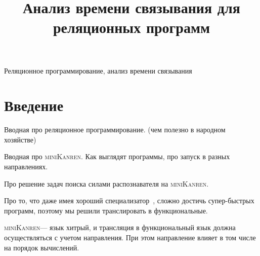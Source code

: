 \documentclass[conference]{IEEEtran}
\begin{document}
\newcommand{\miniKanren}{\textsc{miniKanren}}
\newcommand{\mercury}{\textsc{mercury}}


\title{Анализ времени связывания для реляционных программ}

\author{
\and
{}

}

\maketitle

\begin{abstract}
    
\end{abstract}

\begin{IEEEkeywords}
Реляционное программирование, анализ времени связывания
\end{IEEEkeywords}

\section{Введение}

Вводная про реляционное программирование. (чем полезно в народном хозяйстве)

Вводная про \miniKanren. Как выглядят программы, про запуск в разных направлениях.

Про решение задач поиска силами распознавателя на \miniKanren.~\cite{lozov2019relational}

Про то, что даже имея хороший специализатор~\cite{jones1993partial}, сложно достичь супер-быстрых программ, поэтому мы решили транслировать в функциональные. 

\miniKanren --- язык хитрый, и трансляция в функциональный язык должна осуществляться с учетом направления. При этом направление влияет в том числе на порядок вычислений. 
\end{document}
